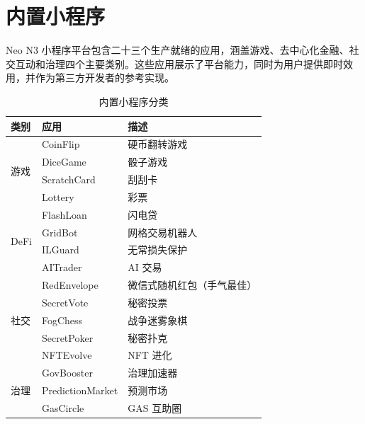 \documentclass[11pt,a4paper]{article}
\begin{document}
\section{内置小程序}

Neo N3 小程序平台包含二十三个生产就绪的应用，涵盖游戏、去中心化金融、社交互动和治理四个主要类别。这些应用展示了平台能力，同时为用户提供即时效用，并作为第三方开发者的参考实现。

\begin{table}[ht]
\centering
\caption{内置小程序分类}
\begin{tabular}{@{}llp{5cm}@{}}
\toprule
\textbf{类别} & \textbf{应用} & \textbf{描述} \\
\midrule
\multirow{4}{*}{游戏} & CoinFlip & 硬币翻转游戏 \\
 & DiceGame & 骰子游戏 \\
 & ScratchCard & 刮刮卡 \\
 & Lottery & 彩票 \\
\midrule
\multirow{4}{*}{DeFi} & FlashLoan & 闪电贷 \\
 & GridBot & 网格交易机器人 \\
 & ILGuard & 无常损失保护 \\
 & AITrader & AI 交易 \\
\midrule
\multirow{5}{*}{社交} & RedEnvelope & 微信式随机红包（手气最佳） \\
 & SecretVote & 秘密投票 \\
 & FogChess & 战争迷雾象棋 \\
 & SecretPoker & 秘密扑克 \\
 & NFTEvolve & NFT 进化 \\
\midrule
\multirow{3}{*}{治理} & GovBooster & 治理加速器 \\
 & PredictionMarket & 预测市场 \\
 & GasCircle & GAS 互助圈 \\
\bottomrule
\end{tabular}
\label{tab:miniapps}
\end{table}
\end{document}
